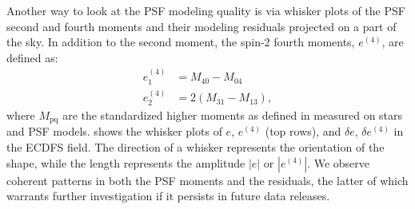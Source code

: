 Another way to look at the \gls{PSF} modeling quality is via whisker plots of the \gls{PSF} second and fourth moments and their modeling residuals projected on a part of the sky.
In addition to the second moment, the spin-2 fourth moments, $e^{(4)}$, are defined as:
\begin{align*}
e^{(4)}_1 &= M_{\text{40}} - M_{\text{04}} \\
e^{(4)}_2 &= 2\left(M_{\text{31}} - M_{\text{13}}\right),
\end{align*}
where $M_{\text{pq}}$ are the standardized higher moments as defined in \cite{2023MNRAS.520.2328Z} measured on stars and PSF models.
 shows
the whisker plots of $e$, $e^{(4)}$ (top rows), and $\delta e$, $\delta e^{(4)}$
in the \gls{ECDFS} field. 
The direction of a whisker represents the orientation of the \gls{shape}, while the length represents the amplitude $|e|$ or $|e^{(4)}|$.
We observe coherent patterns in both the \gls{PSF} moments and the residuals, the latter of which warrants further investigation if it persists in future data releases.

